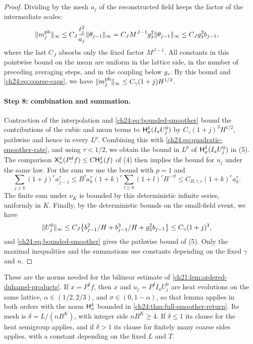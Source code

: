 \begin{proof}
Dividing by the mesh $a_j$ of the reconstructed field keeps the factor of the intermediate scales:
\begin{equation}\label{ch24:eq:physical-mean}
 \lVert m_j^{\mathrm{ph}}\rVert_\infty\le C_J\frac{t_j^2}{a_j}\lVert \theta_{j-1}\rVert_\infty=C_JM^{J-1}g_3^2\lVert \theta_{j-1}\rVert_\infty\le C_Jg_3^2b_{j-1},
\end{equation}
where the last $C_J$ absorbs only the fixed factor $M^{J-1}$. All constants in this pointwise bound on the mean are uniform in the lattice side, in the number of preceding averaging steps, and in the coupling below $g_*$. By this bound and \eqref{ch24:eq:coarse-caps}, we have $\lVert m_j^{\mathrm{ph}}\rVert_\infty\le C_\gamma(1+j)H^{1/2}$.

\paragraph{Step 8: combination and summation.}
Contraction of the interpolation and \eqref{ch24:eq:bounded-smoother} bound the contributions of the cubic and mean terms to $\mathsf H_{\sigma}^{\delta}(I_aU_j^0)$ by $C_\gamma(1+j)^3H^{1/2}$, pathwise and hence in every $L^p$. Combining this with \eqref{ch24:eq:quadratic-smoother-rate}, and using $\tau<1/2$, we obtain the bound in $L^p$ of $\mathsf H_{\sigma}^{\delta}(I_aU_j^0)$ in (5). The comparison $\mathsf X_{\alpha}^{\delta}(P_\cdot^\delta f)\le C\mathsf H_{\sigma}^{\delta}(f)$ of (4) then implies the bound for $u_j$ under the same law. For the sum we use the bound with $p=1$ and
\[
 \sum_{j\ge k}(1+j)^ca_{j-1}^\tau\le B^\tau a_k^\tau(1+k)^c\sum_{l\ge0}(1+l)^cB^{-\tau l}\le C_{B,\tau,c}(1+k)^ca_k^\tau.
\]
The finite sum under $\nu_K$ is bounded by this deterministic infinite series, uniformly in $K$. Finally, by the deterministic bounds on the small-field event, we have
\[
 \lVert U_j^0\rVert_\infty\le C_J\bigl\{b_{j-1}^2/H+b_{j-1}^3/H+g_3^2b_{j-1}\bigr\}\le C_\gamma(1+j)^3,
\]
and \eqref{ch24:eq:bounded-smoother} gives the pathwise bound of (5). Only the maximal inequalities and the summations use constants depending on the fixed $\gamma$ and $n$.
\end{proof}

\begin{remark}\label{ch24:rem:product-application}
These are the norms needed for the bilinear estimate of \cref{ch21:lem:ordered-duhamel-products}. If $x=P_\cdot^\delta f$, then $x$ and $u_j=P_\cdot^\delta I_aU_j^0$ are heat evolutions on the same lattice, $\alpha\in(1/2,2/3)$, and $\sigma\in(0,1-\alpha)$, so that lemma applies in both orders with the norm $\mathsf H_{\sigma}^{\delta}$ bounded in \cref{ch24:thm:full-smoother-return}. Its mesh is $\delta=L/(nB^K)$, with integer side $nB^K\ge4$. If $\delta\le1$ its clause for the heat semigroup applies, and if $\delta>1$ its clause for finitely many coarse sides applies, with a constant depending on the fixed $L$ and $T$.
\end{remark}
